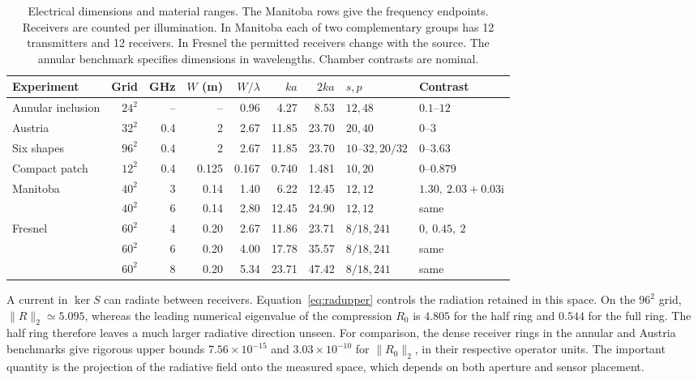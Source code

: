 \begin{table}[tbp]
\centering\small
\caption{Electrical dimensions and material ranges. The Manitoba rows give the frequency endpoints. Receivers are counted per illumination. In Manitoba each of two complementary groups has 12 transmitters and 12 receivers. In Fresnel the permitted receivers change with the source. The annular benchmark specifies dimensions in wavelengths. Chamber contrasts are nominal.}
\label{tab:electrical-acquisitions}
\setlength{\tabcolsep}{3.15pt}
\begin{tabular}{@{}lrrrrrrll@{}}
\toprule
Experiment & Grid & GHz & \(W\) (m) & \(W/\lambda\) & \(ka\) & \(2ka\) & \(s,p\) & Contrast\\
\midrule
Annular inclusion & \(24^2\) & -- & -- & 0.96 & 4.27 & 8.53 & \(12,48\) & \(0.1\)--\(12\)\\
Austria & \(32^2\) & 0.4 & 2 & 2.67 & 11.85 & 23.70 & \(20,40\) & \(0\)--\(3\)\\
Six shapes & \(96^2\) & 0.4 & 2 & 2.67 & 11.85 & 23.70 & \(10\)--\(32,20/32\) & \(0\)--\(3.63\)\\
Compact patch & \(12^2\) & 0.4 & 0.125 & 0.167 & 0.740 & 1.481 & \(10,20\) & \(0\)--\(0.879\)\\
Manitoba & \(40^2\) & 3 & 0.14 & 1.40 & 6.22 & 12.45 & \(12,12\) & \(1.30,\ 2.03+0.03\mathrm{i}\)\\
 & \(40^2\) & 6 & 0.14 & 2.80 & 12.45 & 24.90 & \(12,12\) & same\\
Fresnel & \(60^2\) & 4 & 0.20 & 2.67 & 11.86 & 23.71 & \(8/18,241\) & \(0,\ 0.45,\ 2\)\\
 & \(60^2\) & 6 & 0.20 & 4.00 & 17.78 & 35.57 & \(8/18,241\) & same\\
 & \(60^2\) & 8 & 0.20 & 5.34 & 23.71 & 47.42 & \(8/18,241\) & same\\
\bottomrule
\end{tabular}
\end{table}

A current in \(\ker S\) can radiate between receivers. Equation~\eqref{eq:radupper} controls the radiation retained in this space. On the \(96^2\) grid, \(\|R\|_2\simeq5.095\), whereas the leading numerical eigenvalue of the compression \(R_0\) is \(4.805\) for the half ring and \(0.544\) for the full ring. The half ring therefore leaves a much larger radiative direction unseen. For comparison, the dense receiver rings in the annular and Austria benchmarks give rigorous upper bounds \(7.56\times10^{-15}\) and \(3.03\times10^{-10}\) for \(\|R_0\|_2\), in their respective operator units. The important quantity is the projection of the radiative field onto the measured space, which depends on both aperture and sensor placement.

